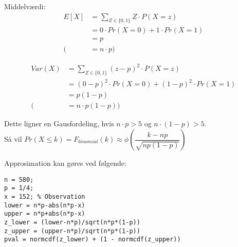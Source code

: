 \documentclass[Main]{subfiles}
\begin{document}
\begin{theo}[Binomialfordeling]
Middelværdi:
\begin{align*}
E[X] &= \sum_{Z \in \{ 0,1\}}Z \cdot P(X=z) \\
	&= 0 \cdot Pr(X=0)+1 \cdot Pr(X=1) \\
	&= p \\
	(&= n \cdot p)
\end{align*}


\begin{align*}
Var(X) &=\sum_{Z \in \{ 0,1\}}(z-p)^2 \cdot P(X=z) \\
	&= (0-p)^2 \cdot Pr(X=0) + (1-p)^2 \cdot Pr(X=1) \\
	&= p(1-p) \\
	(&= n \cdot p(1-p))
\end{align*}

Dette ligner en Gausfordeling, hvis $n \cdot p > 5$ og $n \cdot(1-p) > 5$.  \\
Så vil $Pr(X \leq k) = F_{binomial}(k) \approx \phi\left( \dfrac{k-np}{\sqrt{np(1-p)}}\right)$

Approsimation kan gøres ved følgende:
\begin{lstlisting}[style=Code-Matlab]
%% Approksimativ P-vErdi
n = 580;
p = 1/4;
x = 152; % Observation
lower = n*p-abs(n*p-x)
upper = n*p+abs(n*p-x)
z_lower = (lower-n*p)/sqrt(n*p*(1-p))
z_upper = (upper-n*p)/sqrt(n*p*(1-p))
pval = normcdf(z_lower) + (1 - normcdf(z_upper))
\end{lstlisting}


\end{theo}
\end{document}
